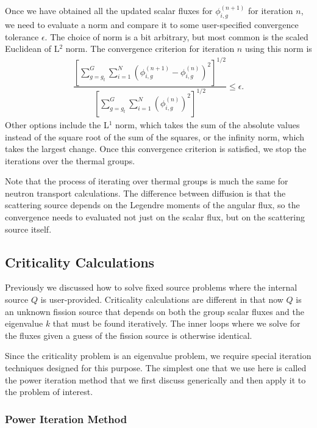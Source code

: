 Once we have obtained all the updated scalar fluxes for $\phi_{i,g}^{(n+1)}$ for iteration $n$, we need to evaluate a norm and compare it to some user-specified convergence tolerance $\epsilon$. The choice of norm is a bit arbitrary, but most common is the scaled Euclidean of L$^2$ norm. The convergence criterion for iteration $n$ using this norm is
\begin{align}
  \dfrac{ \left[ \displaystyle\sum_{g=g_t}^G \sum_{i=1}^N \left( \phi_{i,g}^{(n+1)} - \phi_{i,g}^{(n)} \right)^2 \right]^{1/2} }
  		{ \left[ \displaystyle\sum_{g=g_t}^G \sum_{i=1}^N \left( \phi_{i,g}^{(n)} \right)^2 \right]^{1/2} }  \le \epsilon .
\end{align}
Other options include the L$^1$ norm, which takes the sum of the absolute values instead of the square root of the sum of the squares, or the infinity norm, which takes the largest change. Once this convergence criterion is satisfied, we stop the iterations over the thermal groups.

Note that the process of iterating over thermal groups is much the same for neutron transport calculations. The difference between diffusion is that the scattering source depends on the Legendre moments of the angular flux, so the convergence needs to evaluated not just on the scalar flux, but on the scattering source itself.

\subsection{Criticality Calculations}

Previously we discussed how to solve fixed source problems where the internal source $Q$ is user-provided. Criticality calculations are different in that now $Q$ is an unknown fission source that depends on both the group scalar fluxes and the eigenvalue $k$ that must be found iteratively. The inner loops where we solve for the fluxes given a guess of the fission source is otherwise identical. 

Since the criticality problem is an eigenvalue problem, we require special iteration techniques designed for this purpose. The simplest one that we use here is called the power iteration method that we first discuss generically and then apply it to the problem of interest.

\subsubsection{Power Iteration Method}

